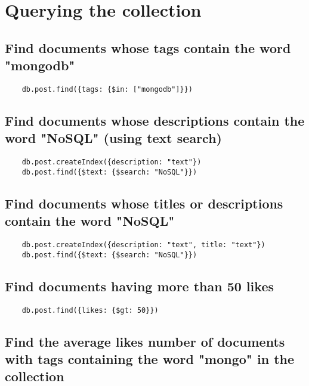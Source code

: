 \lstset{style=mystyle}

\section{Querying the collection}

\subsection{Find documents whose tags contain the word "mongodb"}

\begin{lstlisting}
    db.post.find({tags: {$in: ["mongodb"]}})
\end{lstlisting}


\subsection{Find documents whose descriptions contain the word "NoSQL" (using text search)}

\begin{lstlisting}
    db.post.createIndex({description: "text"})
    db.post.find({$text: {$search: "NoSQL"}})
\end{lstlisting}

\subsection{Find documents whose titles or descriptions contain the word "NoSQL"}

\begin{lstlisting}
    db.post.createIndex({description: "text", title: "text"})
    db.post.find({$text: {$search: "NoSQL"}})
\end{lstlisting}

\subsection{Find documents having more than 50 likes}

\begin{lstlisting}
    db.post.find({likes: {$gt: 50}})
\end{lstlisting}

\subsection{Find the average likes number of documents with tags containing the word "mongo" in the collection}

